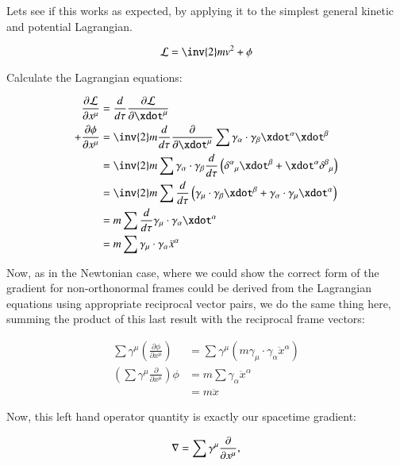 Lets see if this works as expected, by applying it to the simplest general
kinetic and potential Lagrangian.

\begin{equation}
\mathcal{L} = \inv{2} m v^2 + \phi
\end{equation}

Calculate the Lagrangian equations:

\begin{align*}
\frac{\partial \mathcal{L}}{\partial x^{\mu}} &= \frac{d}{d\tau} \frac{\partial \mathcal{L}}{\partial \xdot^{\mu}} \\
+ \frac{\partial \phi}{\partial x^{\mu}} 
&= \inv{2} m \frac{d}{d\tau} \frac{\partial}{\partial \xdot^{\mu}} \sum \gamma_{\alpha} \cdot \gamma_{\beta} \xdot^{\alpha} \xdot^{\beta} \\
&= \inv{2} m \sum \gamma_{\alpha} \cdot \gamma_{\beta} \frac{d}{d\tau} \left({\delta^{\alpha}}_{\mu} \xdot^{\beta} + \xdot^{\alpha} {\delta^{\beta}}_{\mu}\right) \\
&= \inv{2} m \sum \frac{d}{d\tau}
\left(\gamma_{\mu} \cdot \gamma_{\beta} \xdot^{\beta} + \gamma_{\alpha} \cdot \gamma_{\mu} \xdot^{\alpha} \right) \\
&= m \sum \frac{d}{d\tau} \gamma_{\mu} \cdot \gamma_{\alpha} \xdot^{\alpha} \\
&= m \sum \gamma_{\mu} \cdot \gamma_{\alpha} \ddot{x}^{\alpha} \\
\end{align*}

Now, as in the Newtonian case, where we could show the correct form of the gradient for non-orthonormal frames could be derived from the Lagrangian equations using appropriate reciprocal vector pairs, we do the same thing here, summing the product of this last result with the reciprocal frame vectors:

\begin{align*}
\sum \gamma^{\mu} \left(\frac{\partial \phi}{\partial x^{\mu}}\right) &= \sum \gamma^{\mu} \left(m \gamma_{\mu} \cdot \gamma_{\alpha} \ddot{x}^{\alpha}\right) \\
\left(\sum \gamma^{\mu} \frac{\partial}{\partial x^{\mu}}\right) \phi 
&= m \sum \gamma_{\alpha} \ddot{x}^{\alpha} \\
&= m \ddot{x}
\end{align*}

Now, this left hand operator quantity is exactly our spacetime gradient:

\begin{equation}
\nabla = \sum \gamma^{\mu} \frac{\partial}{\partial x^{\mu}},
\end{equation}

